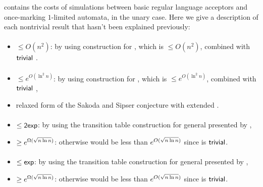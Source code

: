  contains the costs of simulations between basic regular language acceptors and once-marking $1$-limited automata, in the unary case.
Here we give a description of each nontrivial result that hasn't been explained previously:

\paragraph{\ONFA{}\tto\OMODLA}\label{cost:1NFAtoOM1DLAu}
\begin{itemize}
	\item $\le O(n^2)$: by using construction for \hyperref[cost:1NFAto2DFAu]{\ONFA{}\tto\TDFA}, which is $\le O(n^2)$, combined with $\mathsf{trivial}$ \TDFA{}\tto\OMODLA.
\end{itemize}
\paragraph{\TNFA{}\tto\OMODLA}
\begin{itemize}
	\item $\le e^{O(\ln^2n)}$: by using construction for \hyperref[cost:2NFAto2DFAu]{\TNFA{}\tto\TDFA}, which is $\le e^{O(\ln^2n)}$, combined with $\mathsf{trivial}$ \TDFA{}\tto\OMODLA,
	\item relaxed form of the Sakoda and Sipser conjecture with extended \TDFA.
\end{itemize}
\paragraph{\OMOLA{}\tto\ODFA}
\begin{itemize}
	\item $\le\mathsf{2exp}$: by using the transition table construction for general \OLA presented by ,
	\item $\ge e^{\Omega(\sqrt{n\ln n})}$: otherwise \hyperref[cost:2DFAto1DFAu]{\TDFA{}\tto\ODFA} would be less than $e^{O(\sqrt{n\ln n})}$ since \TDFA{}\tto\OMOLA is $\mathsf{trivial}$.
\end{itemize}
\paragraph{\OMOLA{}\tto\ONFA}\label{cost:OM1LAto1NFAu}
\begin{itemize}
	\item $\le\mathsf{exp}$: by using the transition table construction for general \OLA presented by ,
	\item $\ge e^{\Omega(\sqrt{n\ln n})}$: otherwise \hyperref[cost:2DFAto1NFAu]{\TDFA{}\tto\ONFA} would be less than $e^{O(\sqrt{n\ln n})}$ since \TDFA{}\tto\OMOLA is $\mathsf{trivial}$.
\end{itemize}
